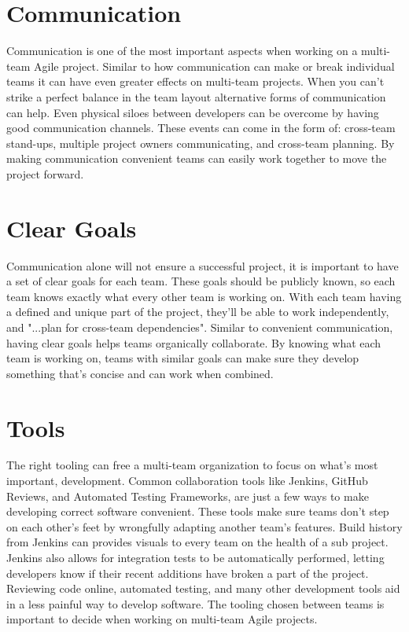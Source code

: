 \documentclass[sigplan,screen]{acmart}
\begin{document}
\section{Communication}
Communication is one of the most important aspects when working on a multi-team Agile project.
Similar to how communication can make or break individual teams it can have even greater effects on multi-team projects.
When you can't strike a perfect balance in the team layout alternative forms of communication can help.
Even physical siloes between developers can be overcome by having good communication channels.
These events can come in the form of: cross-team stand-ups, multiple project owners communicating, and cross-team planning\cite{b3}.
By making communication convenient teams can easily work together to move the project forward.

\section{Clear Goals}
Communication alone will not ensure a successful project, it is important to have a set of clear goals for each team.
These goals should be publicly known, so each team knows exactly what every other team is working on.
With each team having a defined and unique part of the project, they'll be able to work independently, and "...plan for cross-team dependencies"\cite{b3}. 
Similar to convenient communication, having clear goals helps teams organically collaborate.
By knowing what each team is working on, teams with similar goals can make sure they develop something that's concise and can work when combined.


\section{Tools}
The right tooling can free a multi-team organization to focus on what's most important, development.
Common collaboration tools like Jenkins, GitHub Reviews, and Automated Testing Frameworks, are just a few ways to make developing correct software convenient.
These tools make sure teams don't step on each other's feet by wrongfully adapting another team's features.
Build history from Jenkins can provides visuals to every team on the health of a sub project.
Jenkins also allows for integration tests to be automatically performed, letting developers know if their recent additions have broken a part of the project.
Reviewing code online, automated testing, and many other development tools aid in a less painful way to develop software.
The tooling chosen between teams is important to decide when working on multi-team Agile projects.
\end{document}
